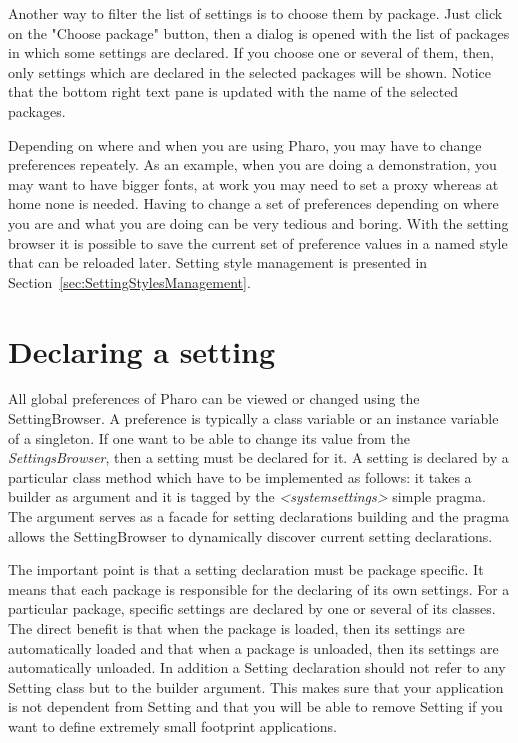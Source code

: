 \documentclass[a4paper,10pt,twoside]{book}
\begin{document}
Another way to filter the list of settings is to choose them by package. Just click on the "Choose package" button, then a dialog is opened with the list of packages in which some settings are declared. If you choose one or several of them, then, only settings which are declared in the selected packages will be shown. Notice that the bottom right text pane is updated with the name of the selected packages.

Depending on where and when you are using Pharo, you may have to change preferences repeately. As an example, when you are doing a demonstration, you may want to have bigger fonts, at work you may need to set a proxy whereas at home none is needed. Having to change a set of preferences depending on where you are and what you are doing can be very tedious and boring. With the setting browser it is possible to save the current set of preference values in a named style that can be reloaded later. Setting style management is presented in Section~\ref{sec:SettingStylesManagement}.

\section{Declaring a setting}
\label{sec:DeclaringASetting}

All global preferences of Pharo can be viewed or changed using the SettingBrowser. A preference is typically a class variable or an instance variable of a singleton. If one want to be able to change its value from the \textit{SettingsBrowser}, then a setting must be declared for it.
A setting is declared by a particular class method which have to be implemented as follows: it takes a builder as argument and it is tagged by the \textit{<systemsettings>} simple pragma. 
The argument  serves as a facade for setting declarations building and the pragma allows the SettingBrowser to dynamically discover current setting declarations.

The important point is that a setting declaration must be package specific. It means that each package is responsible for the declaring of its own settings. For a particular package, specific settings are declared by one or several of its classes. The direct benefit is that when the package is loaded, then its settings are automatically loaded and that when a package is unloaded, then its settings are automatically unloaded. In addition a Setting declaration should not refer to any Setting class but to the builder argument. This makes sure that your application is not dependent from Setting and that you will be able to remove Setting if you want to 
define extremely small footprint applications. 
\end{document}

